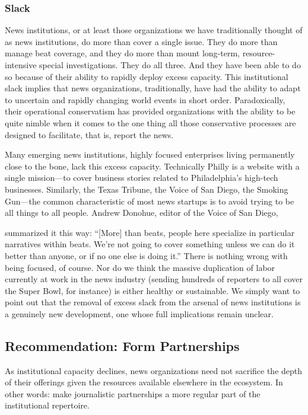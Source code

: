 \subsubsection{Slack}

News institutions, or at least those organizations we have traditionally thought of
as news institutions, do more than cover a single issue. They do more than manage
beat coverage, and they do more than mount long-term, resource-intensive
special investigations. They do all three. And they have been able to do so because
of their ability to rapidly deploy excess capacity. This institutional slack implies
that news organizations, traditionally, have had the ability to adapt to uncertain
and rapidly changing world events in short order. Paradoxically, their operational
conservatism has provided organizations with the ability to be quite nimble
when it comes to the one thing all those conservative processes are designed to
facilitate, that is, report the news.

Many emerging news institutions, highly focused enterprises living permanently
close to the bone, lack this excess capacity. Technically Philly is a website with
a single mission—to cover business stories related to Philadelphia’s high-tech
businesses. Similarly, the Texas Tribune, the Voice of San Diego, the Smoking
Gun—the common characteristic of most news startups is to avoid trying to
be all things to all people. Andrew Donohue, editor of the Voice of San Diego,

summarized it this way: ``[More] than beats, people here specialize in particular
narratives within beats. We’re not going to cover something unless we can do it
better than anyone, or if no one else is doing it.''
There is nothing wrong with being focused, of course. Nor do we think the
massive duplication of labor currently at work in the news industry (sending
hundreds of reporters to all cover the Super Bowl, for instance) is either healthy
or sustainable. We simply want to point out that the removal of excess slack from
the arsenal of news institutions is a genuinely new development, one whose full
implications remain unclear.

\subsection{Recommendation: Form Partnerships}

As institutional capacity declines, news organizations need not sacrifice
the depth of their offerings given the resources available elsewhere in
the ecosystem. In other words: make journalistic partnerships a more
regular part of the institutional repertoire.

